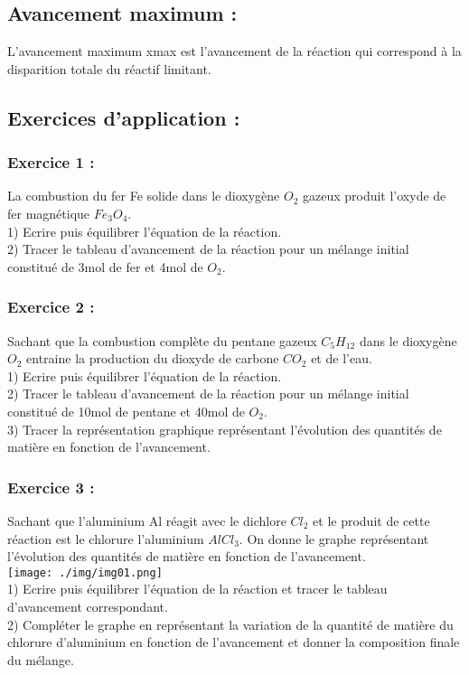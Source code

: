 \documentclass[12pt]{article}
\begin{document}
\subsection{Avancement maximum :}
L’avancement maximum xmax est l’avancement de la réaction qui correspond à la disparition totale du réactif limitant.

\subsection{Exercices d’application : }
\subsubsection{Exercice 1 :}
La combustion du fer Fe solide dans le dioxygène $O_2$ gazeux produit l’oxyde de fer magnétique $Fe_3O_4$.\\
1) Ecrire puis équilibrer l’équation de la réaction.\\
2) Tracer le tableau d’avancement de la réaction pour un mélange initial constitué de 3mol de fer et 4mol de $O_2$.

\subsubsection{Exercice 2 :}
Sachant que la combustion complète du pentane gazeux $C_5H_12$ dans le dioxygène $O_2$ entraine la production du dioxyde de
carbone $CO_2$ et de l’eau.\\
1) Ecrire puis équilibrer l’équation de la réaction.\\
2) Tracer le tableau d’avancement de la réaction pour un mélange initial constitué de 10mol de pentane et 40mol de $O_2$.\\
3) Tracer la représentation graphique représentant l’évolution des quantités de matière en fonction de l’avancement.


\subsubsection{Exercice 3 :}
Sachant que l’aluminium Al réagit avec le dichlore $Cl_2$ et le produit de cette réaction est le chlorure l’aluminium $AlCl_3$.
On donne le graphe représentant l’évolution des quantités de matière en fonction de l’avancement.\\

\texttt{[image: ./img/img01.png]}\\
1) Ecrire puis équilibrer l’équation de la réaction et tracer le tableau d’avancement correspondant.\\
2) Compléter le graphe en représentant la variation de la quantité de matière du chlorure d’aluminium en fonction
de l’avancement et donner la composition finale du mélange.
\end{document}
